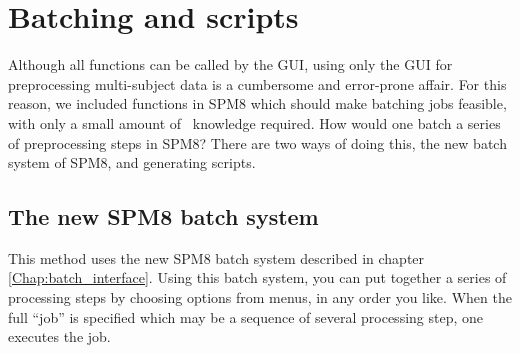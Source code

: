 \section{Batching and scripts}
Although all functions can be called by the GUI, using only the GUI for preprocessing multi-subject data is a cumbersome and error-prone affair. For this reason, we included functions in SPM8 which should make batching jobs feasible, with only a small amount of \matlab\ knowledge required. How would one batch a series of preprocessing steps in SPM8? There are two ways of doing this, the new batch system of SPM8, and generating scripts.

\subsection{The new SPM8 batch system}
This method uses the new SPM8 batch system described in chapter \ref{Chap:batch_interface}. Using this batch system, you can put together a series of processing steps by choosing options from menus, in any order you like. When the full ``job'' is specified which may be a sequence of several processing step, one executes the job.


